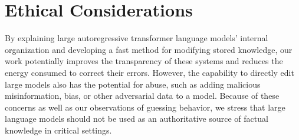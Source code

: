 
\section{Ethical Considerations}
By explaining large autoregressive transformer language models' internal organization and developing a fast method for modifying stored knowledge, our work potentially improves the transparency of these systems and reduces the energy consumed to correct their errors.  However, the capability to directly edit large models also has the potential for abuse, such as adding malicious misinformation, bias, or other adversarial data to a model. Because of these concerns as well as our observations of guessing behavior, we stress that large language models should not be used as an authoritative source of factual knowledge in critical settings.
